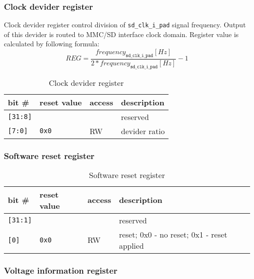     \subsubsection{Clock devider register}
    \label{sec:div_reg}
    
    Clock devider register control division of \texttt{sd\_clk\_i\_pad} signal frequency. Output of this devider is routed to MMC/SD interface clock domain.
    Register value is calculated by following formula:
    \begin{equation}
    REG = \frac{frequency_{\texttt{sd\_clk\_i\_pad}}[Hz]}{2*frequency_{\texttt{sd\_clk\_i\_pad}}[Hz]} - 1
    \end{equation} 
    
    \begin{table}[H]
    \caption{Clock devider register}
        \begin{tabular}{m{1.3cm}|m{2cm}|m{1cm}|m{8cm}}
                \rowcolor[gray]{0.7} bit \# & reset value & access & description \\ \hline \hline
                \texttt{[31:8]} & & & reserved \\ \hline
                \texttt{[7:0]} & \texttt{0x0} & RW & devider ratio \\ \hline
                \hline
        \end{tabular}
        \label{tab:div_reg}
    \end{table}
    
    \subsubsection{Software reset register}
    \label{sec:reset_reg}
    
    \begin{table}[H]
    \caption{Software reset register}
        \begin{tabular}{m{1.3cm}|m{2cm}|m{1cm}|m{8cm}}
                \rowcolor[gray]{0.7} bit \# & reset value & access & description \\ \hline \hline
                \texttt{[31:1]} & & & reserved \\ \hline
                \texttt{[0]} & \texttt{0x0} & RW & reset; 0x0 - no reset; 0x1 - reset applied \\ \hline
                \hline
        \end{tabular}
        \label{tab:reset_reg}
    \end{table}
    
    \subsubsection{Voltage information register}
    \label{sec:voltage_reg}
    

